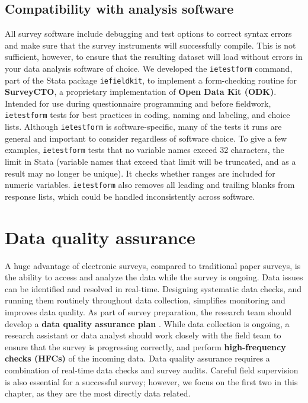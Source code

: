 \subsection{Compatibility with analysis software}
All survey software include debugging and test options to correct syntax errors and make sure that the survey instruments will successfully compile.
This is not sufficient, however, to ensure that the resulting dataset will load without errors in your data analysis software of choice.
We developed the \texttt{ietestform}
command, part of
the Stata package
\texttt{iefieldkit}, to implement a form-checking routine for \textbf{SurveyCTO}, a proprietary implementation of \textbf{Open Data Kit (ODK)}.
Intended for use during questionnaire programming and before fieldwork,
\texttt{ietestform} tests for best practices in coding, naming and labeling,
and choice lists.
Although \texttt{ietestform} is software-specific, many of the tests it runs are general and important to consider regardless of software choice.
To give a few examples, \texttt{ietestform} tests that no variable names exceed
32 characters, the limit in Stata (variable names that exceed that limit will
be truncated, and as a result may no longer be unique). It checks whether
ranges are included for numeric variables.
\texttt{ietestform} also removes all leading and trailing blanks from response lists, which could be handled inconsistently across software.


\section{Data quality assurance}
A huge advantage of electronic surveys, compared to traditional paper surveys, is the ability to access and analyze the data while the survey is ongoing.
Data issues can be identified and resolved in real-time. Designing systematic data checks, and running them routinely throughout data collection, simplifies monitoring and improves data quality.
As part of survey preparation, the research team should develop a \textbf{data quality assurance plan} .
While data collection is ongoing, a research assistant or data analyst should work closely with the field team to ensure that the survey is progressing correctly, and perform \textbf{high-frequency checks (HFCs)} of the incoming data.
Data quality assurance requires a combination of real-time data checks and survey audits. Careful field supervision is also essential for a successful survey; however, we focus on the first two in this chapter, as they are the most directly data related.


